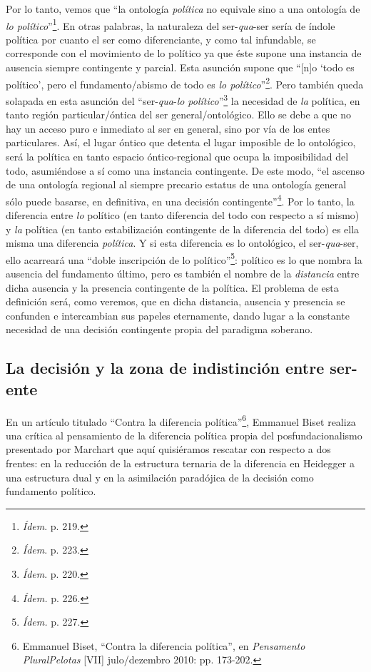 Por lo tanto, vemos que \enquote{la ontología \emph{política} no equivale sino a una ontología de \emph{lo político}}\footnote{\emph{Ídem}. p. 219.}. En otras palabras, la naturaleza del ser-\emph{qua}-ser sería de índole política por cuanto el ser como diferenciante, y como tal infundable, se corresponde con el movimiento de lo político ya que éste supone una instancia de ausencia  siempre contingente y parcial. Esta asunción supone que \enquote{{[}n{]}o \enquote{todo es político}, pero el fundamento/abismo de todo es \emph{lo político}}\footnote{\emph{Ídem}. p. 223.}. Pero también queda solapada en esta asunción del \enquote{ser-\emph{qua}-\emph{lo político}}\footnote{\emph{Ídem}. p. 220.} la necesidad de \emph{la} política, en tanto región particular/óntica del ser general/ontológico. Ello se debe a que no hay un acceso puro e inmediato al ser en general, sino por vía de los entes particulares. Así, el lugar óntico que detenta el lugar imposible de lo ontológico, será la política en tanto espacio óntico-regional que ocupa la imposibilidad del todo, asumiéndose a sí como una instancia contingente. De este modo, \enquote{el ascenso de una ontología regional al siempre precario estatus de una ontología general sólo puede basarse, en definitiva, en una decisión contingente}\footnote{\emph{Ídem.} p. 226.}. Por lo tanto, la diferencia entre \emph{lo} político (en tanto diferencia del todo con respecto a sí mismo) y \emph{la} política (en tanto estabilización contingente de la diferencia del todo) es ella misma una diferencia \emph{política}. Y si esta diferencia es lo ontológico, el ser-\emph{qua}-ser, ello acarreará una \enquote{doble inscripción de lo político}\footnote{\emph{Ídem.} p. 227.}: político es lo que nombra la ausencia del fundamento último, pero es también el nombre de la \emph{distancia} entre dicha ausencia y la presencia contingente de la política. El problema de esta definición será, como veremos, que en dicha distancia, ausencia y presencia se confunden e intercambian sus papeles eternamente, dando lugar a la constante necesidad de una decisión contingente propia del paradigma soberano.

\subsection{La decisión y la zona de indistinción entre ser-ente}

En un artículo titulado \enquote{Contra la diferencia política}\footnote{Emmanuel Biset, \enquote{Contra la diferencia política}, en \emph{Pensamento Plural\textbar Pelotas} {[}VII{]} julo/dezembro 2010: pp. 173-202.}, Emmanuel Biset realiza una crítica al pensamiento de la diferencia política propia del posfundacionalismo presentado por Marchart que aquí quisiéramos rescatar con respecto a dos frentes: en la reducción de la estructura ternaria de la diferencia en Heidegger a una estructura dual y en la asimilación paradójica de la decisión como fundamento político.

